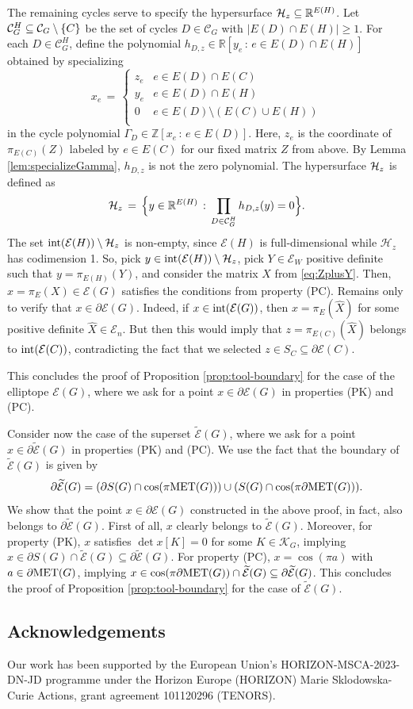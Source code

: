 \documentclass[a4paper, 11pt, twoside]{article}
\newcommand{\R}{\mathbb{R}}
\newcommand{\ME}{{\mathcal E}}
\newcommand{\MET}{\text{\rm MET}}
\newcommand{\MK}{{\mathcal K}}
\newcommand{\MC}{{\mathcal C}}
\newcommand{\MH}{{\mathcal H}}
\newcommand{\tME}{\widetilde \ME}
\theoremstyle{plain}
\begin{document}
The remaining cycles serve to specify the hypersurface ${\cal H}_z\subseteq \R^{E(H)}$. Let ${\cal C}_G^H \subseteq \MC_G \setminus \{C\}$ be the set of cycles $D\in\MC_G$ with $|E(D)\cap E(H)|\ge 1$.
For each $D \in \MC_G^H$, define the polynomial  $h_{D,z} \in \mathbb{R}[y_e \, : \, e \in E(D) \cap E(H)]$ obtained by specializing 
\[ x_e \, = \, \begin{cases} z_e & e \in E(D)\cap E(C) \\ 
y_e & e \in E(D)\cap E(H) \\
0 & e \in E(D) \setminus (E(C) \cup E(H))\\
\end{cases}
\]
in the cycle polynomial $\Gamma_D \in \mathbb{Z}[x_e \, : \, e \in E(D)]$. Here, $z_e$ is the coordinate of $\pi_{E(C)}(Z)$ labeled by $e\in E(C)$ for our fixed matrix $Z$ from above. By Lemma \ref{lem:specializeGamma}, $h_{D,z}$ is not the zero polynomial. 
The hypersurface ${\cal H}_z $ is defined as 
\[ {\cal H}_z \, = \, \Big\{ y \in  \mathbb{R}^{E(H)} \, : \, \prod_{D \in {\cal C}^H_G} h_{D,z}(y)  = 0 \Big\}. \]
The set ${\rm int}(\ME(H)) \setminus {\cal H}_z$ is non-empty, since $\ME(H)$ is full-dimensional while $\MH_z$ has codimension 1.
 So, pick $y\in {\rm int}(\ME(H)) \setminus {\cal H}_z$, pick $Y\in \ME_W$ positive definite such that $y=\pi_{E(H)}(Y)$, and consider the matrix $X$ from \eqref{eq:ZplusY}. Then, $x=\pi_E(X)\in\ME(G)$ satisfies the conditions from property (PC). 
Remains only to verify that  $x\in\partial \ME(G)$. Indeed, if $x\in \text{\rm int}(\ME(G))$,
then $x=\pi_E(\widehat X)$ for some positive definite $\widehat X\in \ME_n$. But then this would imply
 that $z=\pi_{E(C)}(\widehat X)$ belongs to $\text{\rm int}(\ME(C))$, contradicting the fact that we selected $z\in S_C\subseteq \partial \ME(C)$. 

This concludes the proof of Proposition \ref{prop:tool-boundary} for the case of the elliptope $\ME(G)$, where we ask for a point $x\in \partial \ME(G)$ in properties (PK) and (PC).

 Consider now the case of the superset $\tME(G)$, where we ask for a point $x\in\partial \tME(G)$ in properties (PK) and (PC). We use the fact that 
the boundary of $\tME(G)$ is given by
\[\partial \tME(G) =(\partial S(G) \cap \cos(\pi\MET(G))) \cup (S(G)\cap\cos(\pi \partial \MET(G))).\]
We  show that the point $x\in \partial \ME(G)$ constructed in the above proof, in fact, also belongs to $\partial \tME(G)$. First of all, $x$ clearly belongs to $\tME(G)$. Moreover, for property (PK), $x$ satisfies $\det x[K]=0$ for some   $K\in \MK_G$, implying $x\in\partial S(G)\cap \tME(G)\subseteq \partial \tME(G)$.
For property (PC),   $x=\cos(\pi a) $ with  $a\in \partial \MET(G)$, implying
 $x\in \cos(\pi\partial \MET(G))\cap \tME(G)\subseteq \partial \tME(G)$.
This concludes the proof of Proposition \ref{prop:tool-boundary} for the case of $\tME(G)$.

\subsection*{Acknowledgements}
Our work has been supported by the European Union's HORIZON-MSCA-2023-DN-JD programme under the Horizon Europe (HORIZON) Marie Sklodowska-Curie Actions, grant agreement
101120296 (TENORS).





\end{document}
